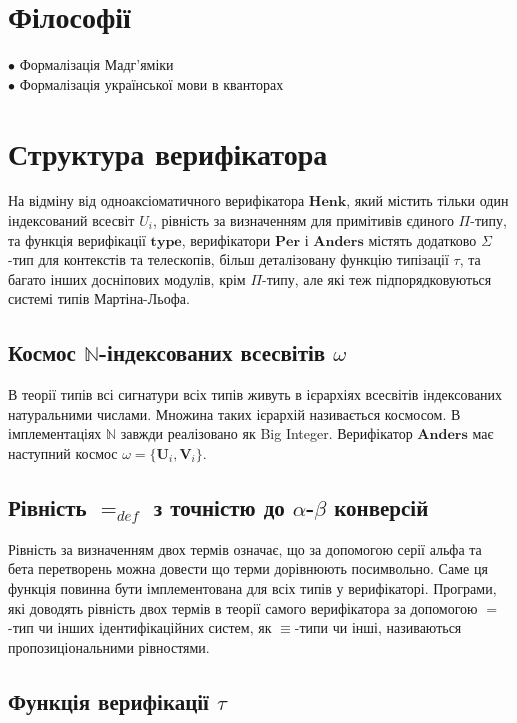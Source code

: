 \documentclass{article}
\theoremstyle{definition}
\begin{document}
\section*{Філософії}

\noindent $\bullet$ Формалізація Мадг'яміки \\
$\bullet$ Формалізація української мови в кванторах

\newpage
\section*{Структура верифікатора}

На відміну від одноаксіоматичного верифікатора $\mathbf{Henk}$, який містить тільки
один індексований всесвіт $U_i$, рівність за визначенням для примітивів єдиного $\Pi$-типу,
та функція верифікації $\mathbf{type}$, верифікатори $\mathbf{Per}$ і $\mathbf{Anders}$ містять додатково
$\Sigma$-тип для контекстів та телескопів, більш деталізовану функцію типізації $\tau$,
та багато інших досніпових модулів, крім $\Pi$-типу, але які теж підпорядковуються системі типів Мартіна-Льофа.

\subsection*{Космос $\mathbb{N}$-індексованих всесвітів $\omega$}

В теорії типів всі сигнатури всіх типів живуть в ієрархіях
всесвітів індексованих натуральними числами. Множина таких
ієрархій називається космосом. В імплементаціях $\mathbb{N}$
завжди реалізовано як Big Integer. Верифікатор $\mathbf{Anders}$ має
наступний космос $\omega = \{ \mathbf{U}_i, \mathbf{V}_i \}$.

\subsection*{Рівність $=_{def}$ з точністю до $\alpha$-$\beta$ конверсій}

Рівність за визначенням двох термів означає, що за допомогою серії альфа та бета
перетворень можна довести що терми дорівнюють посимвольно. Саме ця функція повинна бути
імплементована для всіх типів у верифікаторі. Програми, які доводять рівність двох термів
в теорії самого верифікатора за допомогою $=$-тип чи інших ідентифікаційних систем, як $\equiv$-типи чи інші,
називаються пропозиціональними рівностями.

\subsection*{Функція верифікації $\tau$}
\end{document}
